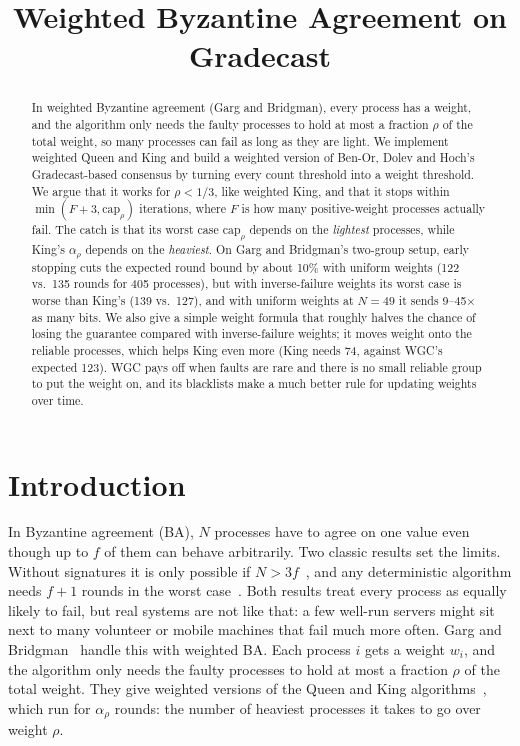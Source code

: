 \documentclass[conference]{IEEEtran}
\theoremstyle{definition}
\newcommand{\capr}{\mathrm{cap}_\rho}
\begin{document}
\title{Weighted Byzantine Agreement on Gradecast}

\author{ }

\maketitle

\begin{abstract}
In weighted Byzantine agreement (Garg and Bridgman), every process has a weight, and the algorithm only needs the faulty processes to hold at most a fraction $\rho$ of the total weight, so many processes can fail as long as they are light. We implement weighted Queen and King and build a weighted version of Ben-Or, Dolev and Hoch's Gradecast-based consensus by turning every count threshold into a weight threshold. We argue that it works for $\rho<1/3$, like weighted King, and that it stops within $\min(F+3,\capr)$ iterations, where $F$ is how many positive-weight processes actually fail. The catch is that its worst case $\capr$ depends on the \emph{lightest} processes, while King's $\alpha_\rho$ depends on the \emph{heaviest}. On Garg and Bridgman's two-group setup, early stopping cuts the expected round bound by about 10\% with uniform weights (122 vs.\ 135 rounds for 405 processes), but with inverse-failure weights its worst case is worse than King's (139 vs.\ 127), and with uniform weights at $N=49$ it sends 9--45$\times$ as many bits. We also give a simple weight formula that roughly halves the chance of losing the guarantee compared with inverse-failure weights; it moves weight onto the reliable processes, which helps King even more (King needs 74, against WGC's expected 123). WGC pays off when faults are rare and there is no small reliable group to put the weight on, and its blacklists make a much better rule for updating weights over time.
\end{abstract}

\section{Introduction}

In Byzantine agreement (BA), $N$ processes have to agree on one value even though up to $f$ of them can behave arbitrarily. Two classic results set the limits. Without signatures it is only possible if $N>3f$~\cite{pease1980}\cite{lamport1982}, and any deterministic algorithm needs $f+1$ rounds in the worst case~\cite{fischer1982}. Both results treat every process as equally likely to fail, but real systems are not like that: a few well-run servers might sit next to many volunteer or mobile machines that fail much more often. Garg and Bridgman~\cite{garg2011} handle this with weighted BA. Each process $i$ gets a weight $w_i$, and the algorithm only needs the faulty processes to hold at most a fraction $\rho$ of the total weight. They give weighted versions of the Queen and King algorithms~\cite{berman1989asymptotically,berman1989towards}, which run for $\alpha_\rho$ rounds: the number of heaviest processes it takes to go over weight $\rho$.
\end{document}
